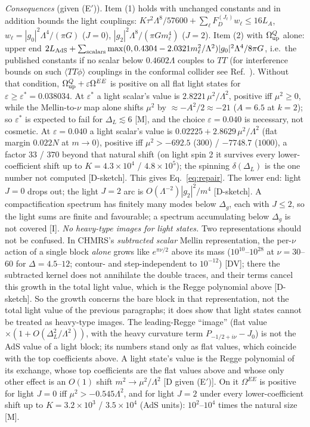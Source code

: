 \documentclass[aps,prl,onecolumn,superscriptaddress,nofootinbib]{revtex4-2}
\begin{document}
\emph{Consequences} (given (E$'$)). Item (1) holds with unchanged constants and in addition bounds the light couplings:
$K\tau^2\Lambda^8/57600+\sum_\ell F_D^{(J_\ell)}w_\ell\le16L_A$, $w_\ell=|g_0|^2\Lambda^4/(\pi G)$
($J=0$), $|g_2|^2\Lambda^8/(\pi Gm_\ell^4)$ ($J=2$). Item (2) with $\Omega^Q_{\rm up}$ alone: upper end
$2L_{\rm AdS}+\sum_{\rm scalars}\max(0,0.4304-2.0321m_\ell^2/\Lambda^2)|g_0|^2\Lambda^4/8\pi G$, i.e.\
the published constants if no scalar below $0.4602\Lambda$ couples to $TT$ (for interference bounds on such
$\langle TT\phi\rangle$ couplings in the conformal collider see Ref.~\cite{CMT}). Without that condition,
$\Omega^Q_{\rm up}+\varepsilon\Omega^{EE}$ is positive on all flat light states for $\varepsilon\ge\varepsilon^*=0.038034$. At
$\varepsilon^*$ a light scalar's value is $2.8221\,\mu^2/\Lambda^2$, positive iff $\mu^2\ge0$, while the Mellin-to-$\nu$ map alone
shifts $\mu^2$ by $\approx-A^2/2\approx-21$ ($A=6.5$ at $k=2$); so $\varepsilon^*$ is expected to fail for $\Delta_L\lesssim6$ [M], and
the choice $\varepsilon=0.040$ is necessary, not cosmetic. At $\varepsilon=0.040$ a light scalar's value is
$0.02225+2.8629\,\mu^2/\Lambda^2$ (flat margin $0.022N$ at $m\to0$), positive iff $\mu^2>-692.5$ ($300$) / $-7748.7$ ($1000$), a
factor $33$ / $370$ beyond that natural shift (on light spin 2 it survives every lower-coefficient shift up to $K=4.3\times10^4$ /
$4.8\times10^5$); the spinning $\delta(\Delta_L)$ is the one number not computed [D-sketch]. This gives
Eq.~\eqref{eq:repair}. The lower end: light
$J=0$ drops out; the light $J=2$ arc is $O(\Lambda^{-2})|g_2|^2/m^4$ [D-sketch]. A compactification spectrum has
finitely many modes below $\Delta_g$, each with $J\le2$, so the light sums are finite and favourable; a spectrum
accumulating below $\Delta_g$ is not covered [I].
\emph{No heavy-type images for light states.} Two representations should not be confused. In CHMRS's \emph{subtracted scalar}
Mellin representation, the per-$\nu$ action of a single block \emph{alone} grows like $e^{\pi\nu/2}$ above its mass
($10^{10}$--$10^{28}$ at $\nu=30$--$60$ for $\Delta=4.5$--$12$; contour- and step-independent to $10^{-12}$) [DV]; there the subtracted
kernel does not annihilate the double traces, and their terms cancel this growth in the total light value, which is the Regge
polynomial above [D-sketch]. So the growth concerns the bare block in that representation, not the total light value of the
previous paragraphs; it does show that light states cannot be treated as heavy-type images. The leading-Regge ``image'' (flat value
$\times(1+O(\Delta_L^2/\Lambda^2))$, with the heavy curvature term $P_{-1/2+i\nu}-J_0$) is not the AdS value of a light block; its numbers
stand only as flat values, which coincide with the top coefficients above. A light state's value is the Regge polynomial of its
exchange, whose top coefficients are the flat values above and whose only other effect is an $O(1)$ shift $m^2\to\mu^2/\Lambda^2$
[D given (E$'$)]. On it $\Omega^{EE}$ is positive for light $J=0$ iff $\mu^2>-0.545\Lambda^2$, and for light $J=2$ under every
lower-coefficient shift up to $K=3.2\times10^3$ / $3.5\times10^4$ (AdS units): $10^2$--$10^4$ times the natural size [M].
\end{document}
